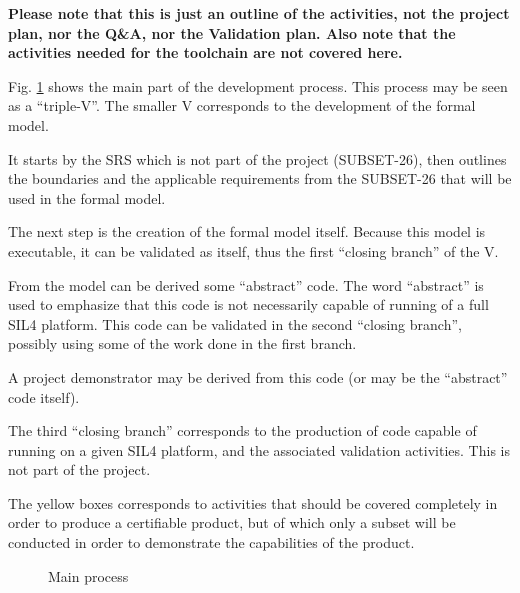 \documentclass{template/openetcs_article}
\begin{document}
\textbf{Please note that this is just an outline of the activities, not the project plan, nor the 
Q\&A, nor the Validation plan. Also note that the activities needed for the toolchain are not
covered here.}

Fig. \ref{fig:main_process} shows the main part of the development process. This process may be seen
as a ``triple-V''. The smaller V corresponds to the development of the formal model. 

It starts by the SRS which is not part of the project (SUBSET-26), then outlines the boundaries and 
the applicable requirements from the SUBSET-26 that will be used in the formal model. 

The next step is the creation of the formal model itself. Because this model is executable, it can 
be validated as itself, thus the first ``closing branch'' of the V.

From the model can be derived some ``abstract'' code. The word ``abstract'' is used to emphasize that 
this code is not necessarily capable of running of a full SIL4 platform. This code can be validated 
in the second ``closing branch'', possibly using some of the work done in the first branch. 

A project demonstrator may be derived from this code (or may be the ``abstract'' code itself).

The third ``closing branch'' corresponds to the production of code capable of running on a 
given SIL4 platform, and the associated validation activities. This is not part of the project.

The yellow boxes corresponds to activities that should be covered completely in order to produce 
a certifiable product, but of which only a subset will be conducted in order to demonstrate the 
capabilities of the product.

\begin{figure}
  \centering
  \caption{Main process}
  \label{fig:main_process}
\end{figure}
\end{document}

